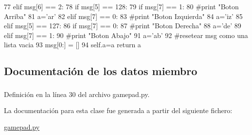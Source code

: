 \begin{DoxyCode}
77                                 elif msg[6] == 2:
78                                         if msg[5] == 128:
79                                                 if msg[7] == 1:
80                                                         #print "Boton Arriba"
81                                                         a='ar'
82                                                 elif msg[7] == 0:
83                                                         #print "Boton Izquierda"
84                                                         a='iz'
85                                         elif msg[5] == 127:
86                                                 if msg[7] == 0:
87                                                         #print "Boton Derecha"
88                                                         a='de'
89                                                 elif msg[7] == 1:
90                                                         #print "Boton Abajo"
91                                                         a='ab'
92                                 #resetear msg como una lista vacia
93                                 msg[0:] = []
94                 self.a=a
                return a
\end{DoxyCode}


\subsection{Documentación de los datos miembro}
\hypertarget{classgamepad_1_1gamepad_a06303222a83dcb4e07be733da7ab35cd}{
\subsubsection[{a}]{}}
\label{classgamepad_1_1gamepad_a06303222a83dcb4e07be733da7ab35cd}


Definición en la línea 30 del archivo gamepad.py.



La documentación para esta clase fue generada a partir del siguiente fichero:\begin{DoxyCompactItemize}
\item 
\hyperlink{gamepad_8py}{gamepad.py}\end{DoxyCompactItemize}
